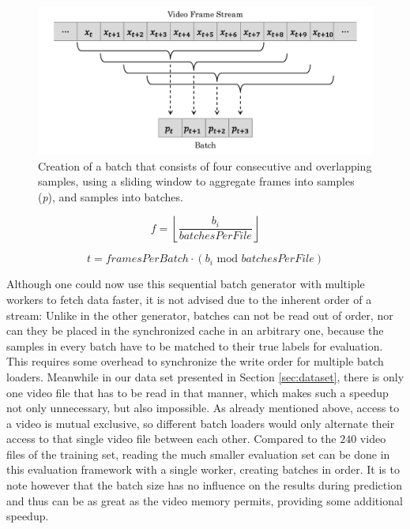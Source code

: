 \begin{figure}
	\centering
	\includegraphics[width=1\textwidth]{graphics/anomalyDetection/ads/batchGeneration/sequential/sequentialBatchGenerator.pdf}
  \caption[Creation of a batch that consists of consecutive samples.]{Creation of a batch that consists of four consecutive and overlapping samples, using a sliding window to aggregate frames into samples (\textit{p}), and samples into batches.}
  \label{fig:sequential_bgen}
\end{figure}

\begin{equation} \label{eq:day2}
f = \left \lfloor {\frac{b_i}{batchesPerFile}} \right \rfloor
\end{equation}

\begin{equation} \label{eq:offset2}
t = framesPerBatch \cdot (b_i  \text{ mod } batchesPerFile)
\end{equation}

Although one could now use this sequential batch generator with multiple workers to fetch data faster, it is not advised due to the inherent order of a stream: Unlike in the other generator, batches can not be read out of order, nor can they be placed in the synchronized cache in an arbitrary one, because the samples in every batch have to be matched to their true labels for evaluation. This requires some overhead to synchronize the write order for multiple batch loaders. Meanwhile in our data set presented in Section \ref{sec:dataset}, there is only one video file that has to be read in that manner, which makes such a speedup not only unnecessary, but also impossible. As already mentioned above, access to a video is mutual exclusive, so different batch loaders would only alternate their access to that single video file between each other. Compared to the $240$ video files of the training set, reading the much smaller evaluation set can be done in this evaluation framework with a single worker, creating batches in order. It is to note however that the batch size has no influence on the results during prediction and thus can be as great as the video memory permits, providing some additional speedup. 


